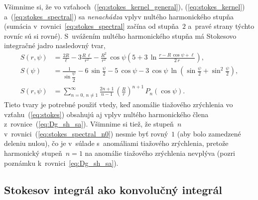 \documentclass[a4paper, 12pt]{book}
\begin{document}
Všimnime si, že vo vzťahoch~(\ref{eq:stokes_kernel_general}), 
(\ref{eq:stokes_kernel}) a~(\ref{eq:stokes_spectral}) sa \emph{nenachádza} 
vplyv nultého harmonického stupňa (sumácia v~rovnici~\ref{eq:stokes_spectral} 
začína od stupňa~$2$ a~pravé strany týchto rovníc sú si rovné).  S~uvážením 
nultého harmonického stupňa má Stokesovo integračné jadro nasledovný tvar,
%
\begin{align}
S(r, \psi) &= \frac{2R}{\ell} - 3\frac{R \, \ell}{r^2} - \frac{R^2}{r^2} \, 
\cos\psi\left( 5 + 3 \, \ln \frac{r - R \, \cos\psi + \ell}{2 \, r} \right){,}
\label{eq:stokes_kernel_general_n0}
\\
%
S(\psi) &= \frac{1}{\sin\dfrac{\psi}{2}} - 6 \, \sin\frac{\psi}{2} - 5 \, 
\cos\psi - 3 \, \cos\psi \, \ln\left( \sin\frac{\psi}{2} + \sin^2\frac{\psi}{2} 
\right){,}
\label{eq:stokes_kernel_n0}
\\
%
S(r, \psi) &= \sum_{n = 0{,}\, n \neq 1}^{\infty} \frac{2n + 1}{n - 1} \, 
\left( \frac{R}{r} \right)^{n + 1} \, P_n(\cos\psi){.}
\label{eq:stokes_spectral_n0}
\end{align}
%
Tieto tvary je potrebné použiť vtedy, keď anomálie tiažového zrýchlenia vo 
vzťahu~(\ref{eq:stokes}) obsahujú aj vplyv nultého harmonického člena 
z~rovnice~(\ref{eq:Dg_sh_sa}).  Všimnime si tiež, že stupeň~$n$ 
v~rovnici~(\ref{eq:stokes_spectral_n0}) nesmie byť rovný~$1$ (aby bolo 
zamedzené deleniu nulou), čo je v~súlade s~anomáliami tiažového zrýchlenia, 
pretože harmonický stupeň~$n = 1$ na anomálie tiažového zrýchlenia nevplýva 
(pozri poznámku k~rovnici~\ref{eq:Dg_sh_sa}).


\subsection{Stokesov integrál ako konvolučný integrál}
\label{sec:stokes_convolution}
\end{document}
